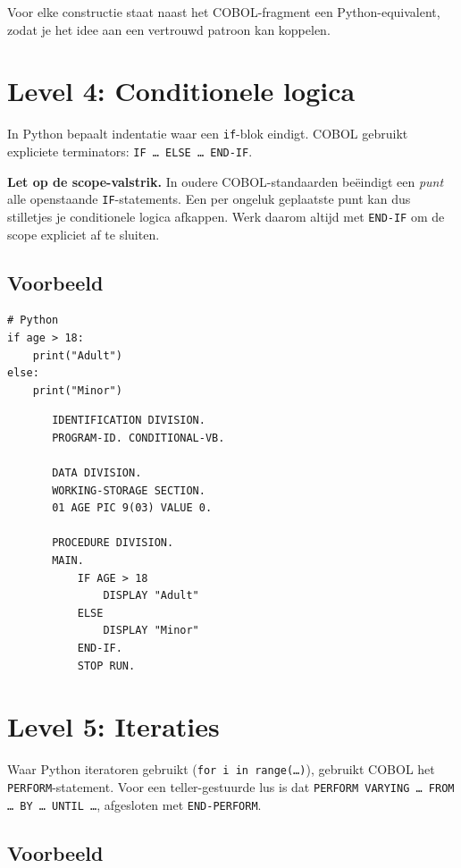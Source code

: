 \documentclass[11pt,a4paper]{article}
\begin{document}
Voor elke constructie staat naast het COBOL-fragment een Python-equivalent, zodat je het idee aan een vertrouwd patroon kan koppelen.

\section{Level 4: Conditionele logica}

In Python bepaalt indentatie waar een \texttt{if}-blok eindigt. 
COBOL gebruikt expliciete terminators: \texttt{IF \ldots\ ELSE \ldots\ END-IF}.

\textbf{Let op de scope-valstrik.} In oudere COBOL-standaarden beëindigt een \emph{punt} alle openstaande \texttt{IF}-statements. 
Een per ongeluk geplaatste punt kan dus stilletjes je conditionele logica afkappen. 
Werk daarom altijd met \texttt{END-IF} om de scope expliciet af te sluiten.

\subsection*{Voorbeeld}

\begin{lstlisting}
# Python
if age > 18:
    print("Adult")
else:
    print("Minor")
\end{lstlisting}

\begin{lstlisting}
       IDENTIFICATION DIVISION.
       PROGRAM-ID. CONDITIONAL-VB.

       DATA DIVISION.
       WORKING-STORAGE SECTION.
       01 AGE PIC 9(03) VALUE 0.

       PROCEDURE DIVISION.
       MAIN.
           IF AGE > 18
               DISPLAY "Adult"
           ELSE
               DISPLAY "Minor"
           END-IF.
           STOP RUN.
\end{lstlisting}

\section{Level 5: Iteraties}

Waar Python iteratoren gebruikt (\texttt{for i in range(\ldots)}), gebruikt COBOL het \texttt{PERFORM}-statement.
Voor een teller-gestuurde lus is dat \texttt{PERFORM VARYING \ldots\ FROM \ldots\ BY \ldots\ UNTIL \ldots}, afgesloten met \texttt{END-PERFORM}.

\subsection*{Voorbeeld}
\end{document}
